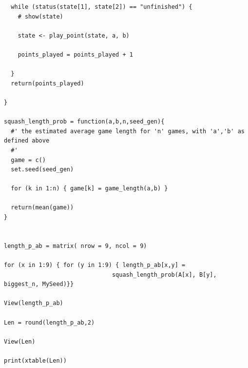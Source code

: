 \documentclass[a4paper, 11pt, oneside]{article}
\begin{document}
\begin{verbatim}
  while (status(state[1], state[2]) == "unfinished") {
    # show(state)
    
    state <- play_point(state, a, b)
    
    points_played = points_played + 1
    
  }
  return(points_played)
  
}

squash_length_prob = function(a,b,n,seed_gen){
  #' the estimated average game length for 'n' games, with 'a','b' as defined above
  #' 
  game = c()
  set.seed(seed_gen)
  
  for (k in 1:n) { game[k] = game_length(a,b) }
  
  return(mean(game))
}


length_p_ab = matrix( nrow = 9, ncol = 9)

for (x in 1:9) { for (y in 1:9) { length_p_ab[x,y] = 
                               squash_length_prob(A[x], B[y], biggest_n, MySeed)}}

View(length_p_ab)

Len = round(length_p_ab,2)

View(Len)

print(xtable(Len))

\end{verbatim}
\end{document}
